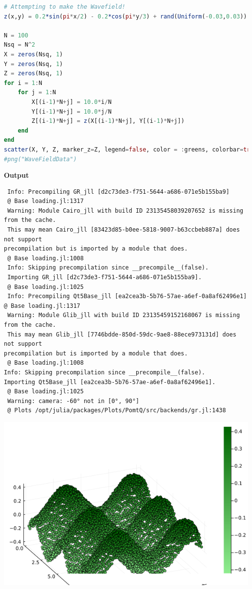 \begin{lstlisting}[language=Julia,style=mystyle]
# Attempting to make the Wavefield!
z(x,y) = 0.2*sin(pi*x/2) - 0.2*cos(pi*y/3) + rand(Uniform(-0.03,0.03))

N = 100
Nsq = N^2
X = zeros(Nsq, 1)
Y = zeros(Nsq, 1)
Z = zeros(Nsq, 1)
for i = 1:N
    for j = 1:N
        X[(i-1)*N+j] = 10.0*i/N
        Y[(i-1)*N+j] = 10.0*j/N
        Z[(i-1)*N+j] = z(X[(i-1)*N+j], Y[(i-1)*N+j])
    end
end
scatter(X, Y, Z, marker_z=Z, legend=false, color = :greens, colorbar=true, camera=(-60, 60))
#png("WaveFieldData")
\end{lstlisting}
\textbf{Output} 
\begin{verbatim}
 Info: Precompiling GR_jll [d2c73de3-f751-5644-a686-071e5b155ba9]
 @ Base loading.jl:1317
 Warning: Module Cairo_jll with build ID 23135458039207652 is missing from the cache.
 This may mean Cairo_jll [83423d85-b0ee-5818-9007-b63ccbeb887a] does not support 
precompilation but is imported by a module that does.
 @ Base loading.jl:1008
 Info: Skipping precompilation since __precompile__(false). 
 Importing GR_jll [d2c73de3-f751-5644-a686-071e5b155ba9].
 @ Base loading.jl:1025
 Info: Precompiling Qt5Base_jll [ea2cea3b-5b76-57ae-a6ef-0a8af62496e1]
@ Base loading.jl:1317
 Warning: Module Glib_jll with build ID 23135459152168067 is missing from the cache.
 This may mean Glib_jll [7746bdde-850d-59dc-9ae8-88ece973131d] does not support 
precompilation but is imported by a module that does.
 @ Base loading.jl:1008
Info: Skipping precompilation since __precompile__(false). 
Importing Qt5Base_jll [ea2cea3b-5b76-57ae-a6ef-0a8af62496e1].
 @ Base loading.jl:1025
 Warning: camera: -60° not in [0°, 90°]
 @ Plots /opt/julia/packages/Plots/PomtQ/src/backends/gr.jl:1438
\end{verbatim}

\vspace*{.2cm}

\includegraphics[width=0.7\columnwidth]{graphics/Chap06/WaveFieldData.png}

